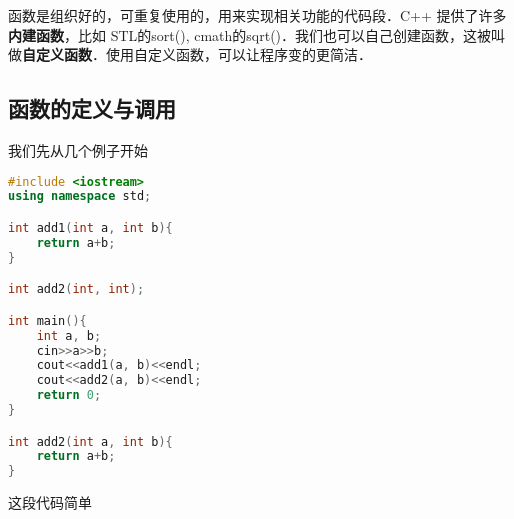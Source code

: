 
函数是组织好的，可重复使用的，用来实现相关功能的代码段．C++ 提供了许多\textbf{内建函数}，比如 STL的sort(), cmath的sqrt()．我们也可以自己创建函数，这被叫做\textbf{自定义函数}．使用自定义函数，可以让程序变的更简洁．

\subsection{函数的定义与调用}
我们先从几个例子开始
\begin{lstlisting}[language=cpp]
#include <iostream>
using namespace std;

int add1(int a, int b){
    return a+b;
}

int add2(int, int);

int main(){
    int a, b;
    cin>>a>>b;
    cout<<add1(a, b)<<endl;
    cout<<add2(a, b)<<endl;
    return 0;
}

int add2(int a, int b){
    return a+b;
}
\end{lstlisting}
这段代码简单